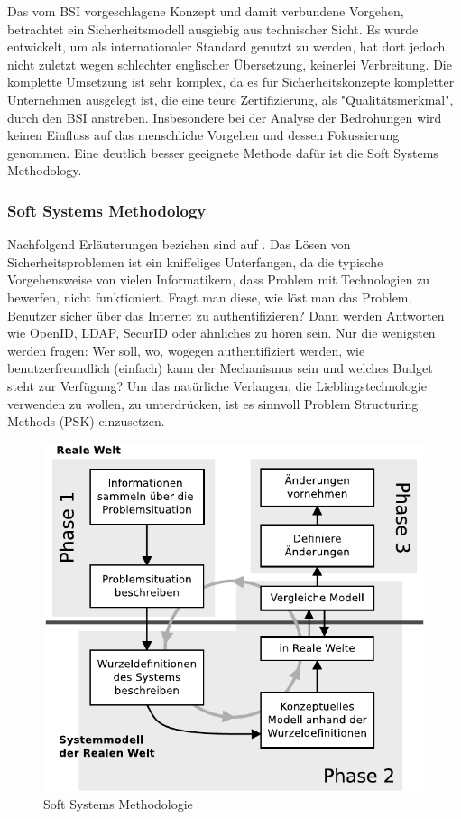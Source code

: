 \documentclass[11pt,a4paper]{report}
\begin{document}
Das vom BSI vorgeschlagene Konzept und damit verbundene Vorgehen, betrachtet ein Sicherheitsmodell ausgiebig aus technischer Sicht. Es wurde entwickelt, um als internationaler Standard genutzt zu werden, hat dort jedoch, nicht zuletzt wegen schlechter englischer Übersetzung, keinerlei Verbreitung. Die komplette Umsetzung ist sehr komplex, da es für Sicherheitskonzepte kompletter Unternehmen ausgelegt ist, die eine teure Zertifizierung, als "Qualitätsmerkmal", durch den BSI anstreben. Insbesondere bei der Analyse der Bedrohungen wird keinen Einfluss auf das menschliche Vorgehen und dessen Fokussierung genommen. Eine deutlich besser geeignete Methode dafür ist die Soft Systems Methodology.

\subsubsection{Soft Systems Methodology} \label{sec:ssm}

Nachfolgend Erläuterungen beziehen sind auf \cite{gutmann9}. 
Das Lösen von Sicherheitsproblemen ist ein kniffeliges Unterfangen, da die typische Vorgehensweise von vielen Informatikern, dass Problem mit Technologien zu bewerfen, nicht funktioniert. Fragt man diese, wie löst man das Problem, Benutzer sicher über das Internet zu authentifizieren? Dann werden Antworten wie OpenID, LDAP, SecurID oder ähnliches zu hören sein. Nur die wenigsten werden fragen: Wer soll, wo, wogegen authentifiziert werden, wie benutzerfreundlich (einfach) kann der Mechanismus sein und welches Budget steht zur Verfügung? Um das natürliche Verlangen, die Lieblingstechnologie verwenden zu wollen, zu unterdrücken, ist es sinnvoll Problem Structuring Methods (PSK) einzusetzen.

\begin{figure}[htbp]
\centering
\includegraphics[scale=0.9]{images/ssm.pdf}
\caption{Soft Systems Methodologie}
\label{fig:ssm}
\end{figure}
\end{document}
